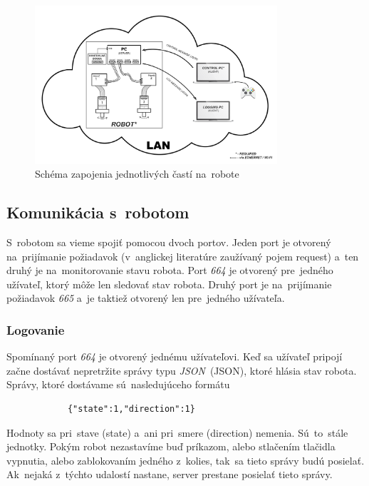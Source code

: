 \clearpage

\begin{figure}[!htbp]
	\begin{center}
		\includegraphics[width=9cm]{img/schemaRobota.png}
	\end{center}
	\caption{Schéma zapojenia jednotlivých častí na~robote \cite{timovyProjekt}}
	\label{fig:schemaRobota}
\end{figure}

\subsection{Komunikácia s~robotom}
\label{subsec:komunikacia}

S~robotom sa vieme spojiť pomocou dvoch portov. Jeden port je otvorený na~prijímanie požiadavok (v~anglickej
literatúre zaužívaný pojem request) a~ten druhý je na~monitorovanie stavu robota. Port \textit{664} je otvorený
pre~jedného užívateľ, ktorý môže len sledovať stav robota. Druhý port je na~prijímanie požiadavok \textit{665}
a~je taktiež otvorený len pre~jedného užívateľa.

\subsubsection{Logovanie}
\label{sec:logovanie}

	Spomínaný port \textit{664} je otvorený jednému užívateľovi. Keď sa užívateľ pripojí začne dostávať nepretržite
	správy typu \textit{JSON}~(\acrlong{JSON}), ktoré hlásia stav robota. Správy, ktoré dostávame sú~nasledujúceho
	formátu

	\begin{lstlisting}
			{"state":1,"direction":1}
	\end{lstlisting}

	Hodnoty sa pri~stave (state) a~ani pri~smere (direction) nemenia. Sú~to~stále jednotky. Pokým robot nezastavíme
	buď príkazom, alebo stlačením tlačidla vypnutia, alebo zablokovaním jedného z~kolies, tak~sa tieto správy budú
	posielať. Ak~nejaká z~týchto udalostí nastane, server prestane posielať tieto správy.

